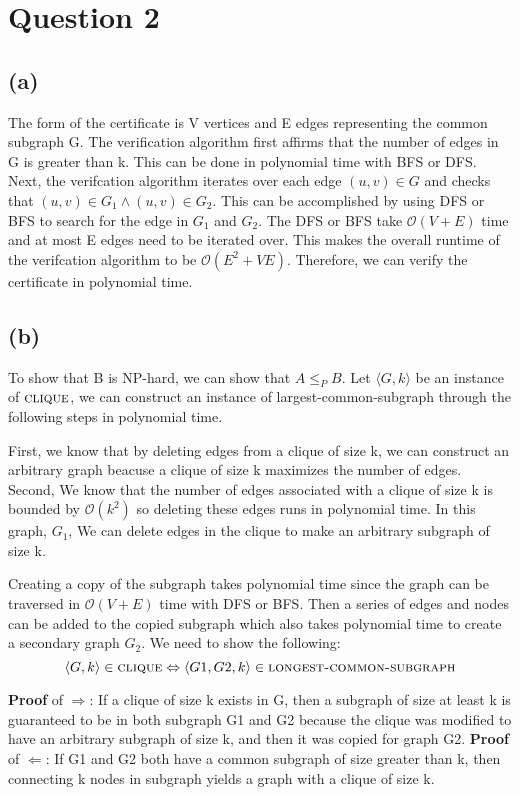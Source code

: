 \section{Question 2}
\subsection{(a)}
The form of the certificate is V vertices and E edges representing the common subgraph G.
The verification algorithm first affirms that the number of edges in G is greater than k.
This can be done in polynomial time with BFS or DFS.
Next, the verifcation algorithm iterates over each edge $(u, v) \in G$ and checks that $(u, v) \in G_1 \land (u, v) \in G_2$.
This can be accomplished by using DFS or BFS to search for the edge in $G_1$ and $G_2$.
The DFS or BFS take $\mathcal{O}(V + E)$ time and at most E edges need to be iterated over.
This makes the overall runtime of the verifcation algorithm to be $\mathcal{O}(E^2 + VE)$.
Therefore, we can verify the certificate in polynomial time.
\subsection{(b)}
To show that B is NP-hard, we can show that $A \leq_P B$. 
Let $\langle G, k \rangle$ be an instance of $\textsc{clique}$,
we can construct an instance of largest-common-subgraph through
the following steps in polynomial time. 

First, we know that by deleting edges from a clique of size k, 
we can construct an arbitrary graph beacuse a clique of size k maximizes
the number of edges. Second, We know that the number of
edges associated with a clique of size k is bounded by $\mathcal{O}(k^2)$
so deleting these edges runs in polynomial time. In this graph, $G_1$, 
We can delete edges in the clique to make an arbitrary subgraph of size k.

Creating a copy of the subgraph takes polynomial time since the graph can be 
traversed in  $\mathcal{O}(V + E)$ time with DFS or BFS. Then a series of edges and nodes
can be added to the copied subgraph which also takes polynomial time to create a secondary 
graph $G_2$. We need to show the following:
\[\langle G, k \rangle \in \textsc{clique} \Leftrightarrow \langle G1, G2, k \rangle \in \textsc{longest-common-subgraph}\]

\textbf{Proof} of $\Rightarrow$:
If a clique of size k exists in G, then a subgraph of size at least k is guaranteed to be 
in both subgraph G1 and G2 because the clique was modified to have an arbitrary subgraph of size k, 
and then it was copied for graph G2. 
\textbf{Proof} of $\Leftarrow$:
If G1 and G2 both have a common subgraph of size greater than k, then connecting k nodes in subgraph
yields a graph with a clique of size k.